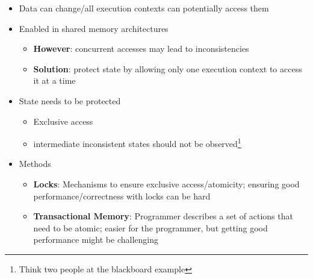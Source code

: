 \documentclass[a4paper]{article}
\begin{document}
\begin{itemize}
\begin{itemize}
\begin{itemize}
\item Data can change/all execution contexts can potentially access them
\item Enabled in shared memory architectures
\begin{itemize}
\item \textbf{However}: concurrent accesses may lead to inconsistencies
\item \textbf{Solution}: protect state by allowing only one execution context to access it at a time
\end{itemize}
\item State needs to be protected
\begin{itemize}
\item Exclusive access
\item intermediate inconsistent states should not be observed\footnote{Think two people at the blackboard example}
\end{itemize}
\item Methods
\begin{itemize}
\item \textbf{Locks}: Mechanisms to ensure exclusive access/atomicity; ensuring good performance/correctness with locks can be hard
\item \textbf{Transactional Memory}: Programmer describes a set of actions that need to be atomic; easier for the programmer, but getting good performance might be challenging
\end{itemize}
\end{itemize}
\end{itemize}
\end{itemize}
\end{document}
